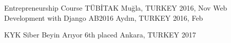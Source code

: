 
\begin{cvhonors}
    \cvhonor
        {Entrepreneurship Course}
        {TÜBİTAK}
        {Muğla, TURKEY}
        {2016, Nov}
    \cvhonor
        {Web Development with Django}
        {AB2016}
        {Aydın, TURKEY}
        {2016, Feb}

\end{cvhonors}

\begin{cvhonors}
    \cvhonor
    	{KYK Siber Beyin Arıyor}
        {6th placed}
        {Ankara, TURKEY}
        {2017}
\end{cvhonors}